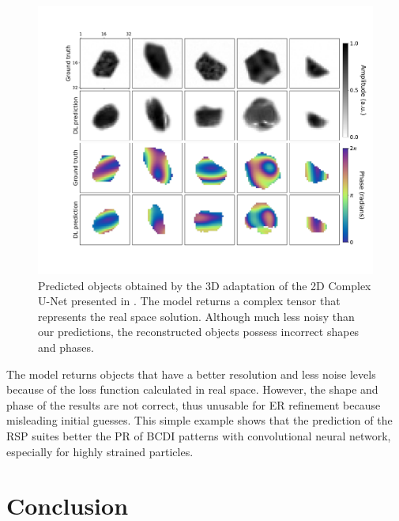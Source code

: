 \begin{figure}[H]
    \centering
    \includegraphics[width=\textwidth]{figures/Phasing/sim_obj_Ian.pdf}
    \caption{Predicted objects obtained by the 3D adaptation of the 2D Complex U-Net presented in \cite{yu_ultrafast_2024}.
    The model returns a complex tensor that represents the real space solution. Although much less noisy than our predictions, 
    the reconstructed objects possess incorrect shapes and phases. }
    \label{fig:Ian_objs}
\end{figure}

The model returns objects that have a better resolution and less noise levels because of the loss function calculated in 
real space. However, the shape and phase of the results are not correct, thus unusable for ER refinement because misleading 
initial guesses. 
This simple example shows that the prediction of the RSP suites better the PR of BCDI patterns with convolutional 
neural network, especially for highly strained particles. 

\section{Conclusion}

